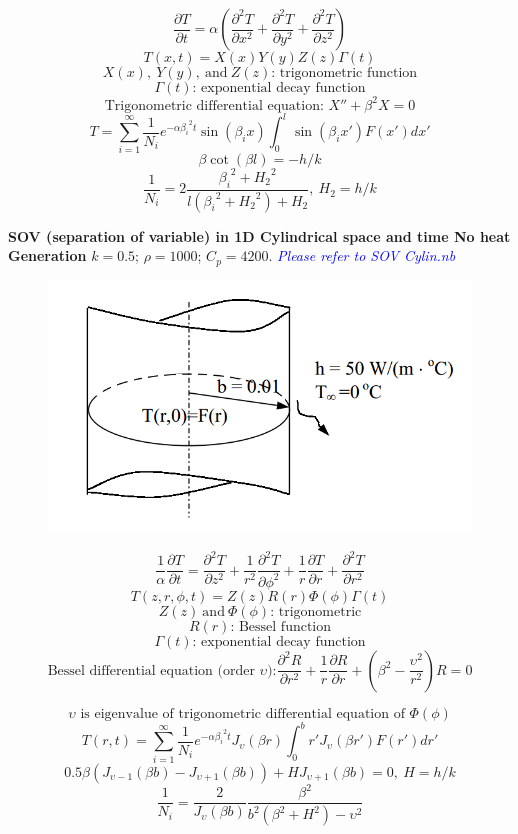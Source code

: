 \begin{appendices}
\begin{example}
$$\frac{\partial T}{\partial t}=
\alpha\left(\frac{\partial^2 T}{\partial x^2}+
\frac{\partial^2 T}{\partial y^2}+
\frac{\partial^2 T}{\partial z^2}\right)$$
$$T(x,t)=X(x)Y(y)Z(z)\Gamma(t)$$
$$X(x),~Y(y),~\text{and} ~Z(z)\text{: trigonometric function}$$
$$\Gamma(t)\text{: exponential decay function}$$
$$\text{Trigonometric differential equation: }X''+\beta^2X=0$$
$$T=\sum_{i=1}^{\infty} \frac{1}{N_i}e^{-\alpha{\beta_i}^2t}\sin{(\beta_i x)}\int_0^{l}\sin{(\beta_i x')}F(x')dx'$$
$$\beta\cot{(\beta l)}=-h/k$$
$$\frac{1}{N_i}=2\frac{{\beta_i}^2+{H_2}^2}{l({\beta_i}^2+{H_2}^2)+H_2},
~H_2=h/k$$
\end{example}
\begin{example}
\textbf{SOV (separation of variable) in 1D Cylindrical space and time
No heat Generation}
$k = 0.5$; $\rho= 1000$; $C_p = 4200$.
\textcolor{blue} {\emph{Please refer to SOV Cylin.nb}}
\begin{figure}[H]
  \centering
    \includegraphics[scale=0.5]{figures/appendixA/6}
\end{figure}
$$\frac{1}{\alpha}\frac{\partial T}{\partial t}=
\frac{\partial^2 T}{\partial z^2}+
\frac{1}{r^2}\frac{\partial^2 T}{\partial \phi^2}+
\frac{1}{r}\frac{\partial T}{\partial r}+
\frac{\partial^2 T}{\partial r^2}$$
$$T(z,r,\phi,t)=Z(z)R(r)\Phi(\phi)\Gamma(t)$$
$$Z(z)~\text{and} ~\Phi(\phi)\text{: trigonometric}$$
$$R(r)\text{: Bessel function}$$
$$\Gamma(t)\text{: exponential decay function}$$
$$\text{Bessel differential equation (order } \upsilon\text{):}
\frac{\partial^2 R}{\partial r^2}+
\frac{1}{r}\frac{\partial R}{\partial r}+
\left(\beta^2-\frac{\upsilon^2}{r^2}\right) R=0
$$

$$\upsilon \text{ is eigenvalue of trigonometric differential equation of } \Phi(\phi)$$
$$T(r,t)=\sum_{i=1}^{\infty} \frac{1}{N_i}e^{-\alpha{\beta_i}^2t}J_\upsilon(\beta r)\int_0^{b}r'J_\upsilon(\beta r')F(r')dr'$$
$$0.5\beta(J_{\upsilon-1}(\beta b)-
J_{\upsilon+1}(\beta b))+
HJ_{\upsilon+1}(\beta b)=0,
~H=h/k
$$
$$\frac{1}{N_i}=\frac{2}{J_\upsilon(\beta b)}
\frac{\beta^2}{b^2(\beta^2+H^2)-\upsilon^2}
$$
\end{example}


\end{appendices}

